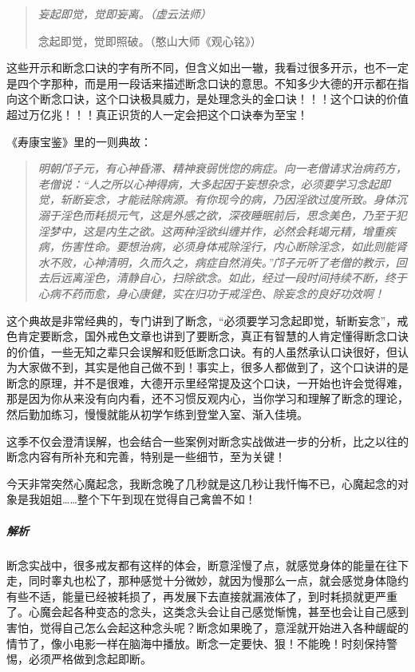 \begin{quotation}\it
    妄起即觉，觉即妄离。（虚云法师）

    念起即觉，觉即照破。（憨山大师《观心铭》）
\end{quotation}

这些开示和断念口诀的字有所不同，但含义如出一辙，我看过很多开示，也不一定是四个字那种，而是用一段话来描述断念口诀的意思。不知多少大德的开示都在指向这个断念口诀，这个口诀极具威力，是处理念头的金口诀！！！这个口诀的价值超过万亿兆！！！真正识货的人一定会把这个口诀奉为至宝！

《寿康宝鉴》里的一则典故：
\begin{quote}\it
    明朝邝子元，有心神昏滞、精神衰弱恍惚的病症。向一老僧请求治病药方，老僧说：“人之所以心神得病，大多起因于妄想杂念，必须要学习念起即觉，斩断妄念，才能祛除病源。有你现今的病，乃因淫欲过度所致。身体沉溺于淫色而耗损元气，这是外感之欲，深夜睡眠前后，思念美色，乃至于犯淫梦中，这是内生之欲。这两种淫欲纠缠并作，必然会耗竭元精，增重疾病，伤害性命。要想治病，必须身体戒除淫行，内心断除淫念，如此则能肾水不败，心神清明，久而久之，病症自然消失。”邝子元听了老僧的教示，回去后远离淫色，清静自心，扫除欲念。如此，经过一段时间持续不断，终于心病不药而愈，身心康健，实在归功于戒淫色、除妄念的良好功效啊！
\end{quote}

这个典故是非常经典的，专门讲到了断念，“必须要学习念起即觉，斩断妄念”，戒色肯定要断念，国外戒色文章也讲到了要断念，真正有智慧的人肯定懂得断念口诀的价值，一些无知之辈只会误解和贬低断念口诀。有的人虽然承认口诀很好，但认为大家做不到，其实是他自己做不到！事实上，很多人都做到了，这个口诀讲的是断念的原理，并不是很难，大德开示里经常提及这个口诀，一开始也许会觉得难，那是因为你从来没有向内看，还不习惯反观内心，当你学习和理解了断念的理论，然后勤加练习，慢慢就能从初学乍练到登堂入室、渐入佳境。

这季不仅会澄清误解，也会结合一些案例对断念实战做进一步的分析，比之以往的断念内容有所补充和完善，特别是一些细节，至为关键！

\begin{case}[断念不能晚]
    今天非常突然心魔起念，我断念晚了几秒就是这几秒让我忏悔不已，心魔起念的对象是我姐姐……整个下午到现在觉得自己禽兽不如！
    \subparagraph{解析} 断念实战中，很多戒友都有这样的体会，断意淫慢了点，就感觉身体的能量在往下走，同时睾丸也松了，那种感觉十分微妙，就因为慢那么一点，就会感觉身体隐约有些不适，能量已经被耗损了，再发展下去直接就漏液体了，到时耗损就更严重了。心魔会起各种变态的念头，这类念头会让自己感觉惭愧，甚至也会让自己感到害怕，觉得自己怎么会起这种念头呢？断念如果晚了，意淫就开始进入各种龌龊的情节了，像小电影一样在脑海中播放。断念一定要快、狠！不能晚！时刻保持警惕，必须严格做到念起即断。
\end{case}

